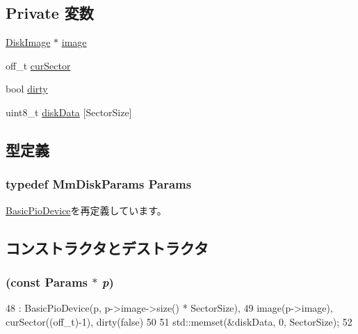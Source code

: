 \subsection*{Private 変数}
\begin{DoxyCompactItemize}
\item 
\hyperlink{classDiskImage}{DiskImage} $\ast$ \hyperlink{classMmDisk_a86d47120637a95e3a6876c774d768030}{image}
\item 
off\_\-t \hyperlink{classMmDisk_ac818f733a8c55e0be72dbdadc453c769}{curSector}
\item 
bool \hyperlink{classMmDisk_ad25edacba00e4d0666a9959053b7cc10}{dirty}
\item 
uint8\_\-t \hyperlink{classMmDisk_a981f17e4c4f4909188222a7be11afaf8}{diskData} \mbox{[}SectorSize\mbox{]}
\end{DoxyCompactItemize}


\subsection{型定義}
\hypertarget{classMmDisk_a9e8be66baf207ea5dcd34d3f71d3734b}{
\subsubsection[{Params}]{\setlength{\rightskip}{0pt plus 5cm}typedef MmDiskParams {\bf Params}}}
\label{classMmDisk_a9e8be66baf207ea5dcd34d3f71d3734b}


\hyperlink{classBasicPioDevice_a2845515ac6467f10540747053c8a0449}{BasicPioDevice}を再定義しています。

\subsection{コンストラクタとデストラクタ}
\hypertarget{classMmDisk_aee281487cb9cc386c7da1b3df89eee9b}{
\subsubsection[{MmDisk}]{ (const {\bf Params} $\ast$ {\em p})}}
\label{classMmDisk_aee281487cb9cc386c7da1b3df89eee9b}



\begin{DoxyCode}
48     : BasicPioDevice(p, p->image->size() * SectorSize),
49       image(p->image), curSector((off_t)-1), dirty(false)
50 {
51     std::memset(&diskData, 0, SectorSize);
52 }
\end{DoxyCode}


